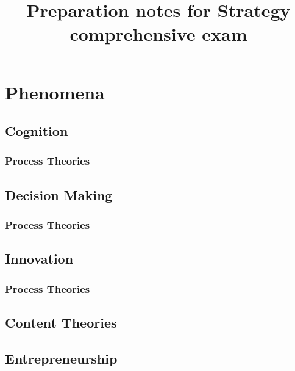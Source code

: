 \documentclass[12pt,letterpaper]{article}
\begin{document}
\setlength{\droptitle}{-5em}
\title{Preparation notes for Strategy comprehensive exam}
\date{\vspace{-12ex}}
\maketitle

\begin{comment}
\begin{abstract} 
\normalsize 
\end{abstract}
{\textbf{Keywords:} \\\indent }
\end{comment}

\pagestyle{fancy}
\fancyhf{}
\rhead{\thepage}

\section{Phenomena}

\subsection{Cognition}
\subsubsection{Process Theories}

\subsection{Decision Making}
\subsubsection{Process Theories}

\subsection{Innovation}
\subsubsection{Process Theories}
\subsection{Content Theories}

\subsection{Entrepreneurship}
\end{document}
